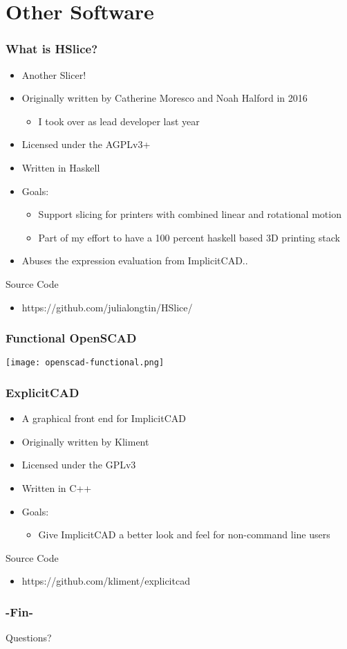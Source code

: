 \documentclass{beamer}
\begin{document}
\section{Other Software}

\begin{frame}
  \frametitle{What is HSlice?}
\begin{itemize}
\item Another Slicer!
\item Originally written by Catherine Moresco and Noah Halford in 2016
  \begin{itemize}
  \item I took over as lead developer last year
  \end{itemize}
\item Licensed under the AGPLv3+
\item Written in Haskell
\item Goals:
  \begin{itemize}
  \item Support slicing for printers with combined linear and rotational motion
  \item Part of my effort to have a 100 percent haskell based 3D printing stack 
  \end{itemize}
\item Abuses the expression evaluation from ImplicitCAD..
\end{itemize}
\begin{block}{Source Code}
\begin{itemize}
\item https://github.com/julialongtin/HSlice/
\end{itemize}
\end{block}
\end{frame}

\begin{frame}
\frametitle{Functional OpenSCAD}
\texttt{[image: openscad-functional.png]}
\end{frame}

\begin{frame}
  \frametitle{ExplicitCAD}
\begin{itemize}
\item A graphical front end for ImplicitCAD
\item Originally written by Kliment
\item Licensed under the GPLv3
\item Written in C++
\item Goals:
  \begin{itemize}
  \item Give ImplicitCAD a better look and feel for non-command line users
  \end{itemize}
\end{itemize}
\begin{block}{Source Code}
\begin{itemize}
\item https://github.com/kliment/explicitcad
\end{itemize}
\end{block}
\end{frame}

\begin{frame}
\frametitle{-Fin-}
\Huge{\centerline{Questions?}}
\end{frame}

\end{document}
